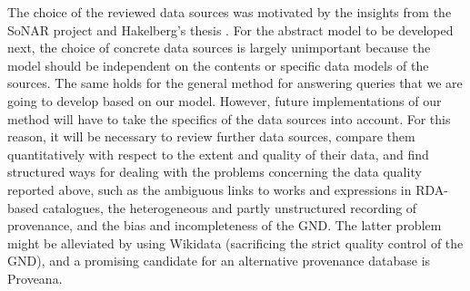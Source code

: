 The choice of the reviewed data sources was motivated by the insights from
the \gls{SoNAR} project and Hakelberg's thesis \autocite{Hakelberg2016}.
For the abstract model to be developed next,
the choice of concrete data sources is largely unimportant
because the model should be independent on the contents or specific data models of the sources.
The same holds for the general method for answering queries that we are going to develop based on our model.
However, future implementations of our method will have to take the specifics
of the data sources into account.
For this reason, it will be necessary to review further data sources,
compare them quantitatively with respect to the extent and quality of their data,
and find structured ways for dealing with the problems concerning the data quality
reported above, such as the ambiguous links to works and expressions in RDA-based
catalogues, the heterogeneous and partly unstructured recording of provenance,
and the bias and incompleteness of the \gls{GND}.
The latter problem might be alleviated by using Wikidata
(sacrificing the strict quality control of the GND),
and a promising candidate for an alternative provenance database is Proveana.
